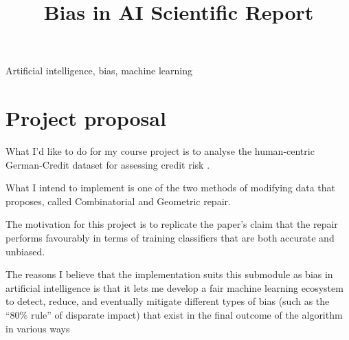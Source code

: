 \documentclass[conference]{IEEEtran}
\begin{document}
\title{Bias in AI Scientific Report}

\author{
}

\maketitle

\begin{abstract}

\end{abstract}

\begin{IEEEkeywords}
Artificial intelligence, bias, machine learning
\end{IEEEkeywords}

\section{Project proposal}

What I'd like to do for my course project is to analyse the human-centric German-Credit dataset for assessing credit risk \cite{}.

What I intend to implement is one of the two methods of modifying data that \cite{Feldman2015ComputationalFP} proposes, called Combinatorial
and Geometric repair. 

The motivation for this project is to replicate the paper's claim that the repair performs favourably in terms of training classifiers that are
both accurate and unbiased.

The reasons I believe that the implementation suits this submodule as bias in artificial intelligence is that it lets me develop a fair machine learning ecosystem
to detect, reduce, and eventually mitigate different types of bias (such as the “80\% rule” of disparate impact) that exist in the final outcome of the algorithm in various ways
\end{document}
